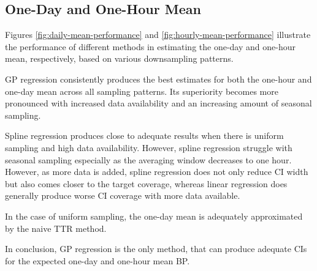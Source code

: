 \subsection{One-Day and One-Hour Mean}

Figures \ref{fig:daily-mean-performance} and \ref{fig:hourly-mean-performance}
illustrate the performance of different methods in estimating the one-day and one-hour mean,
respectively, based on various downsampling patterns.

GP regression consistently produces the best estimates for both the one-hour and
one-day mean across all sampling patterns.
Its superiority becomes more pronounced with increased data availability and
an increasing amount of seasonal sampling.

Spline regression produces close to adequate results when there is uniform sampling
and high data availability.
However, spline regression struggle with seasonal sampling especially
as the averaging window decreases to one hour.
However, as more data is added, spline regression does not
only reduce CI width but also comes closer to the target coverage,
whereas linear regression does generally
produce worse CI coverage with more data available.

In the case of uniform sampling, the one-day mean is adequately approximated
by the naive TTR method.

In conclusion, GP regression is the only method, that can produce
adequate CIs for the expected one-day and one-hour mean BP.


